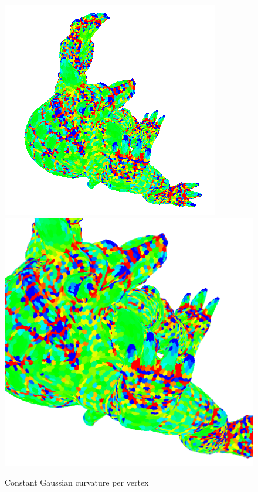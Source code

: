 \begin{figure}[!h]
    \centering
    \centering
    \includegraphics[scale=1.0]{images/gc-armadillo-top.png}
    \endminipage\hfill
    \centering
    \includegraphics[scale=0.4]{images/gc-detail-armadillo-top.png}
    \endminipage
    \caption{Constant Gaussian curvature per vertex} \label{fig:gc-detail}
\end{figure}



